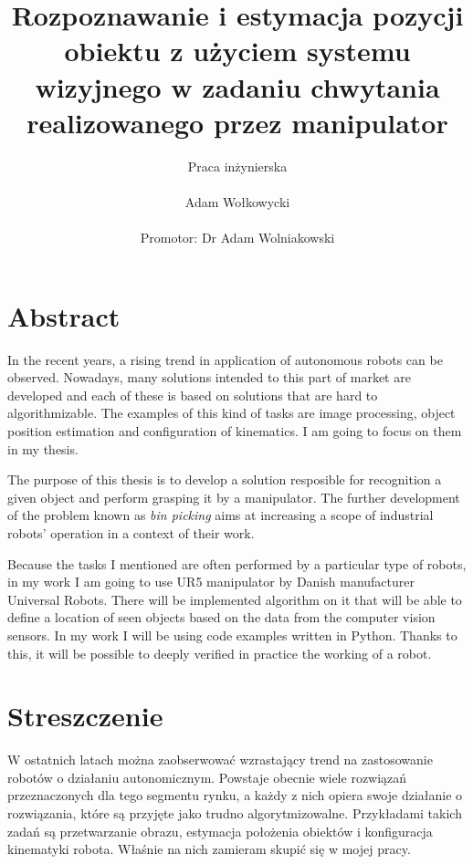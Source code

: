 \documentclass[12pt]{article}
\begin{document}
\title{Rozpoznawanie i estymacja pozycji obiektu z użyciem systemu wizyjnego w zadaniu chwytania realizowanego przez manipulator}
\author{
	Praca inżynierska \\\\
	Adam Wołkowycki \\\\
	Promotor: Dr Adam Wolniakowski
}
\maketitle

\newpage
\section{Abstract}
In the recent years, a rising trend in application of autonomous robots can be observed. Nowadays, many solutions intended to this part of market are developed and each of these is based on solutions that are hard to algorithmizable. The examples of this kind of tasks are image processing, object position estimation and configuration of kinematics. I am going to focus on them in my thesis.

The purpose of this thesis is to develop a solution resposible for recognition a given object and perform grasping it by a manipulator. The further development of the problem known as \emph{bin picking} aims at increasing a scope of industrial robots' operation in a context of their work.

Because the tasks I mentioned are often performed by a particular type of robots, in my work I am going to use UR5 manipulator by Danish manufacturer Universal Robots. There will be implemented algorithm on it that will be able to define a location of seen objects based on the data from the computer vision sensors. In my work I will be using code examples written in Python. Thanks to this, it will be possible to deeply verified in practice the working of a robot.

\newpage
\section{Streszczenie}
W ostatnich latach można zaobserwować wzrastający trend na zastosowanie robotów o działaniu autonomicznym. Powstaje obecnie wiele rozwiązań przeznaczonych dla tego segmentu rynku, a każdy z nich opiera swoje działanie o rozwiązania, które są przyjęte jako trudno algorytmizowalne. Przykładami takich zadań są przetwarzanie obrazu, estymacja położenia obiektów i konfiguracja kinematyki robota. Właśnie na nich zamieram skupić się w mojej pracy.
\end{document}
